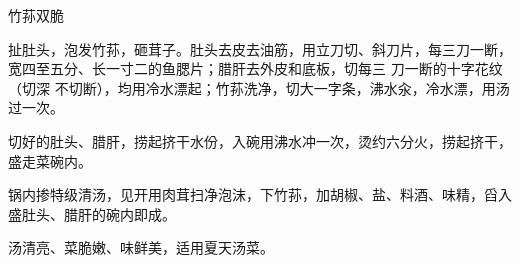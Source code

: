 \begin{recipe}{竹荪双脆}

\ingredients


\preparation

\step 扯肚头，泡发竹荪，砸茸子。肚头去皮去油筋，用立刀切、斜刀片，每三刀一断，
宽四至五分、长一寸二的鱼腮片；腊肝去外皮和底板，切每三 刀一断的十字花纹（切深
不切断），均用冷水漂起；竹荪洗净，切大一字条，沸水汆，冷水漂，用汤过一次。

\step 切好的肚头、腊肝，捞起挤干水份，入碗用沸水冲一次，烫约六分火，捞起挤干，
盛走菜碗内。

\step 锅内掺特级清汤，见开用肉茸扫净泡沫，下竹荪，加胡椒、盐、料酒、味精，舀入
盛肚头、腊肝的碗内即成。

\features

汤清亮、菜脆嫩、味鲜美，适用夏天汤菜。

\end{recipe}

